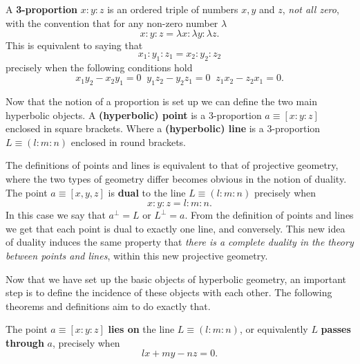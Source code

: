 \documentclass[11pt]{article}
\begin{document}
\pagebreak A \textbf{3-proportion} $x:y:z$ is an ordered triple of numbers $%
x,y$ and $z$, \textit{not all zero}, with the convention that for any
non-zero number $\lambda$ 
\begin{equation*}
x:y:z=\lambda x:\lambda y:\lambda z.
\end{equation*}
This is equivalent to saying that 
\begin{equation*}
x_{1}:y_{1}:z_{1}=x_{2}:y_{2}:z_{2}
\end{equation*}
precisely when the following conditions hold 
\begin{equation}  \label{proportionequal}
x_{1}y_{2}-x_{2}y_{1}=0\;\;y_{1}z_{2}-y_{2}z_{1}=0\;%
\;z_{1}x_{2}-z_{2}x_{1}=0.
\end{equation}

Now that the notion of a proportion is set up we can define the two main
hyperbolic objects. A \textbf{(hyperbolic) point} is a 3-proportion $a\equiv[%
x:y:z]$ enclosed in square brackets. Where a \textbf{(hyperbolic) line} is a
3-proportion $L\equiv(l:m:n)$ enclosed in round brackets.\newline

The definitions of points and lines is equivalent to that of projective
geometry, where the two types of geometry differ becomes obvious in the
notion of duality. The point $a\equiv[x,y,z]$ is \textbf{dual} to the line $%
L\equiv(l:m:n)$ precisely when 
\begin{equation*}
x:y:z=l:m:n.
\end{equation*}
In this case we say that $a^{\perp}=L$ or $L^{\perp}=a$.\newline
From the definition of points and lines we get that each point is dual to
exactly one line, and conversely. This new idea of duality induces the same
property that \textit{there is a complete duality in the theory between
points and lines}, within this new projective geometry.\newline

Now that we have set up the basic objects of hyperbolic geometry, an
important step is to define the incidence of these objects with each other.
The following theorems and definitions aim to do exactly that.\newline

The point $a\equiv[x:y:z]$ \textbf{lies on} the line $L\equiv(l:m:n)$, or
equivalently $L$ \textbf{passes through} $a$, precisely when 
\begin{equation*}
lx+my-nz=0.
\end{equation*}%
\newline
\end{document}
